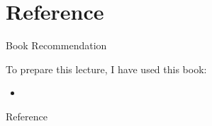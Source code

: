 \documentclass[handout]{beamer} %
\begin{document}
\section{Reference}

\begin{frame}{Book Recommendation}

To prepare this lecture, I have used this book:
\begin{itemize}
	\item {}
\end{itemize}

\end{frame}




\begin{frame}[allowframebreaks]{Reference}


\end{frame}
\end{document}
